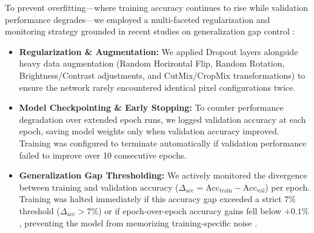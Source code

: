 To prevent overfitting—where training accuracy continues to rise while validation performance degrades—we employed a multi-faceted regularization and monitoring strategy grounded in recent studies on generalization gap control \cite{zhang2024overfitguard}:
\begin{itemize}
    \item \textbf{Regularization \& Augmentation:} We applied Dropout layers alongside heavy data augmentation (Random Horizontal Flip, Random Rotation, Brightness/Contrast adjustments, and CutMix/CropMix transformations) to ensure the network rarely encountered identical pixel configurations twice.
    \item \textbf{Model Checkpointing \& Early Stopping:} To counter performance degradation over extended epoch runs, we logged validation accuracy at each epoch, saving model weights only when validation accuracy improved. Training was configured to terminate automatically if validation performance failed to improve over 10 consecutive epochs.
    \item \textbf{Generalization Gap Thresholding:} We actively monitored the divergence between training and validation accuracy ($\Delta_{\text{acc}} = \text{Acc}_{\text{train}} - \text{Acc}_{\text{val}}$) per epoch. Training was halted immediately if this accuracy gap exceeded a strict $7\%$ threshold ($\Delta_{\text{acc}} > 7\%$) or if epoch-over-epoch accuracy gains fell below $+0.1\%$, preventing the model from memorizing training-specific noise \cite{zhang2024overfitguard}.
\end{itemize}